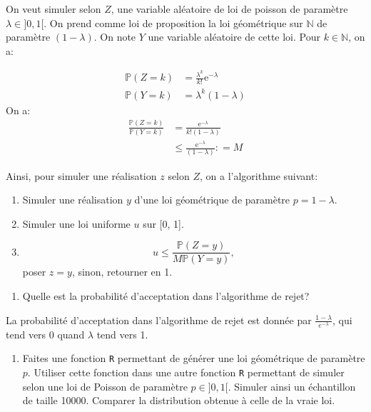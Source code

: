 \documentclass[
]{article}
\providecommand{\tightlist}{%
  \setlength{\itemsep}{0pt}\setlength{\parskip}{0pt}}
\newenvironment{Correction}%
  { \vspace{\baselineskip}\begin{mdframed}[backgroundcolor=my_green]}%
  {\end{mdframed}}
\begin{document}
\begin{Correction}

On veut simuler selon $Z$, une variable aléatoire de loi de poisson  de paramètre $\lambda \in ]0, 1[$. On prend comme loi de proposition la loi géométrique sur $\mathbb{N}$ de paramètre $(1 - \lambda)$. On note $Y$ une variable aléatoire de cette loi.
Pour $k \in \mathbb{N}$, on a:

\begin{align*}
\mathbb{P}(Z = k) &= \frac{\lambda^k}{k!}\text{e}^{-\lambda}\\
\mathbb{P}(Y = k) &= \lambda^{k}(1 - \lambda)
\end{align*}
On a:
\begin{align*}
\frac{\mathbb{P}(Z = k)}{\mathbb{P}(Y = k)} &= \frac{\text{e}^{-\lambda}}{k! (1 - \lambda)}\\
&\leq \frac{\text{e}^{-\lambda}}{(1 - \lambda)} : = M
\end{align*}

Ainsi, pour simuler une réalisation $z$ selon $Z$, on a l'algorithme suivant:

\begin{enumerate}
\item Simuler une réalisation $y$ d'une loi géométrique  de paramètre $p = 1 - \lambda$.
\item Simuler une loi uniforme $u$ sur [0, 1].
\item $$u \leq \frac{\mathbb{P}(Z = y)}{M\mathbb{P}(Y = y)},$$ poser $z = y$, sinon, retourner en 1.
\end{enumerate}

\end{Correction}

\begin{enumerate}
\def\labelenumi{\arabic{enumi}.}
\setcounter{enumi}{3}
\tightlist
\item
  Quelle est la probabilité d'acceptation dans l'algorithme de rejet?
\end{enumerate}

\begin{Correction}
La probabilité d'acceptation dans l'algorithme de rejet est donnée par
$\frac{1 - \lambda}{e^{-\lambda}}$, qui tend vers 0 quand $\lambda$ tend vers 1.
\end{Correction}

\begin{enumerate}
\def\labelenumi{\arabic{enumi}.}
\setcounter{enumi}{4}
\tightlist
\item
  Faites une fonction \texttt{R} permettant de générer une loi
  géométrique de paramètre \(p\). Utiliser cette fonction dans une autre
  fonction \texttt{R} permettant de simuler selon une loi de Poisson de
  paramètre \(p \in ]0, 1[\). Simuler ainsi un échantillon de taille
  10000. Comparer la distribution obtenue à celle de la vraie loi.
\end{enumerate}
\end{document}

